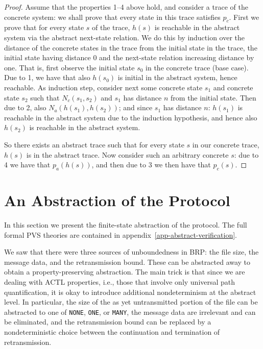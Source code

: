 \begin{proof}

Assume that the  properties 1--4 above  hold, and consider a trace of
the  concrete  system: we shall prove  that  every state in this trace
satisfies $p_c$. First we prove that for every state $s$ of the trace,
$h(s)$ is reachable in the abstract system via the abstract next-state
relation.  We do this by  induction over the  distance of the concrete
states in the trace from  the initial state in  the trace, the initial
state  having   distance  0 and the    next-state  relation increasing
distance by one.   That is, first observe  the initial state  $s_0$ in
the concrete trace (base case).  Due to  1, we have that also $h(s_0)$
is  initial  in the abstract system,    hence reachable.  As induction
step, consider next some concrete state $s_1$ and concrete state $s_2$
such that $N_c(s_1,s_2)$ and  $s_1$ has distance  $n$ from the initial
state.  Then due to 2,  also $N_a(h(s_1),h(s_2))$; and since $s_1$ has
distance $n$: $h(s_1)$ is reachable in the  abstract system due to the
induction hypothesis, and   hence also $h(s_2)$  is  reachable  in the
abstract system.
 
So there exists an abstract trace such that for every state $s$ in our
concrete trace, $h(s)$ is in the  abstract trace. Now consider such an
arbitrary concrete $s$: due to 4  we have that $p_a(h(s))$, and then
due to 3 we then have that $p_c(s)$.

\end{proof}


\section{An Abstraction of the Protocol}

In  this  section we   present   the finite-state abstraction  of  the
protocol.   The  full     formal  PVS  theories  are     contained  in
appendix~\ref{app-abstract-verification}.

\vspace{0.5cm}

We saw that there were three sources of unboundedness in BRP: the file
size, the message data, and the retransmission bound.  These can be
abstracted away to obtain a property-preserving abstraction.  The main
trick is that since we are dealing with ACTL properties, i.e., those that
involve only universal path quantification, it is okay to introduce
additional nondeterminism at the abstract level.  In particular, the size
of the as yet untransmitted portion of the file can be abstracted to one
of {\tt NONE}, {\tt ONE}, or {\tt MANY}, the message data are irrelevant
and can be eliminated, and the retransmission bound can be replaced by a
nondeterministic choice between the continuation and termination of
retransmission.  

